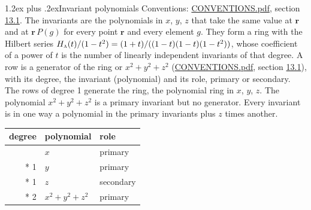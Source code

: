 \documentclass[10pt,a4paper]{article}
\makeatletter
\renewcommand\section{\@startsection{section}{1}{\z@}{-3ex plus -1ex minus -.2ex}%
  {1.2ex plus .2ex}{\normalfont\large\sffamily\bfseries\color{parttitle}}}
\numberwithin{equation}{section}
\newcommand{\irr}[1]{\text{\normalfont\scshape #1}}
\newcommand{\pointr}{\mathbf{r}}
\makeatother
\begin{document}
\section{Invariant polynomials}\label{s:invariant_polynomials}
Conventions: \href{../../CONVENTIONS.pdf}{CONVENTIONS.pdf}, section \href{../../CONVENTIONS.pdf\#conv.13.1}{13.1}.
The invariants are the polynomials in $x$, $y$, $z$ that take the same value at $\pointr$ and at $\pointr\,P(g)$ for every point $\pointr$ and every element $g$. They form a ring with the Hilbert series $H_{\irr{a}}(t)/(1-t^{2}) = (1 + t)/((1-t)(1-t)(1-t^{2}))$, whose coefficient of a power of $t$ is the number of linearly independent invariants of that degree. \label{n:head.degree}\label{n:head.role}A row is a generator of the ring or $x^{2} + y^{2} + z^{2}$ (\href{../../CONVENTIONS.pdf}{CONVENTIONS.pdf}, section \href{../../CONVENTIONS.pdf\#conv.13.1}{13.1}), with its degree, the invariant (polynomial) and its role, primary or secondary. The rows of degree 1 generate the ring, the polynomial ring in $x$, $y$, $z$. The polynomial $x^{2} + y^{2} + z^{2}$ is a primary invariant but no generator. Every invariant is in one way a polynomial in the primary invariants plus $z$ times another.
{\small\begin{longtable}{@{}rll@{}}\toprule
degree & polynomial & role\\\midrule\endhead
\bottomrule\endfoot\endlastfoot
1 & $x$ & primary\\*
1 & $y$ & primary\\*
1 & $z$ & secondary\\*
2 & $x^{2} + y^{2} + z^{2}$ & primary\\
\bottomrule\end{longtable}}
\end{document}

